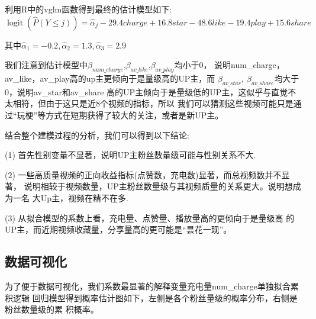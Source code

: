 \documentclass{ctexart}
\begin{document}
利用R中的vglm函数得到最终的估计模型如下:
\begin{equation*}
    \operatorname{logit}(\hat{P}(Y\le j))=\hat\alpha_j-29.4charge+16.8star-48.6like-19.4play+15.6share
\end{equation*}

其中$\hat\alpha_1=-0.2,\hat\alpha_2=1.3,\hat\alpha_3=2.9$

我们注意到估计模型中$\beta_{num\_charge}$,$\beta_{av\_like}$,$\beta_{av\_play}$均小于0，
说明num\_charge，av\_like，av\_play高的up主更倾向于是量级高的UP主，而
$\beta_{av\_star},\ \beta_{av\_share}$均大于0，说明av\_star和av\_share
高的UP主倾向于是量级低的UP主，这似乎与直觉不太相符，但由于这只是近8个视频的指标，所以
我们可以猜测这些视频可能只是通过“玩梗”等方式在短期获得了较大的关注，或者是新UP主。


结合整个建模过程的分析，我们可以得到以下结论:

(1) 首先性别变量不显著，说明UP主粉丝数量级可能与性别关系不大.

(2) 一些高质量视频的正向收益指标(点赞数，充电数)显著，而总视频数并不显著，
说明相较于视频数量，UP主粉丝数量级与其视频质量的关系更大。说明想成为一名
大Up主，视频在精不在多.

(3) 从拟合模型的系数上看，充电量、点赞量、播放量高的更倾向于是量级高
的UP主，而近期视频收藏量，分享量高的更可能是“昙花一现”。

\subsection{数据可视化}

为了便于数据可视化，我们系数最显著的解释变量充电量num\_charge单独拟合累积逻辑
回归模型得到概率估计图如下，左侧是各个粉丝量级的概率分布，右侧是粉丝数量级的累
积概率。
\end{document}
